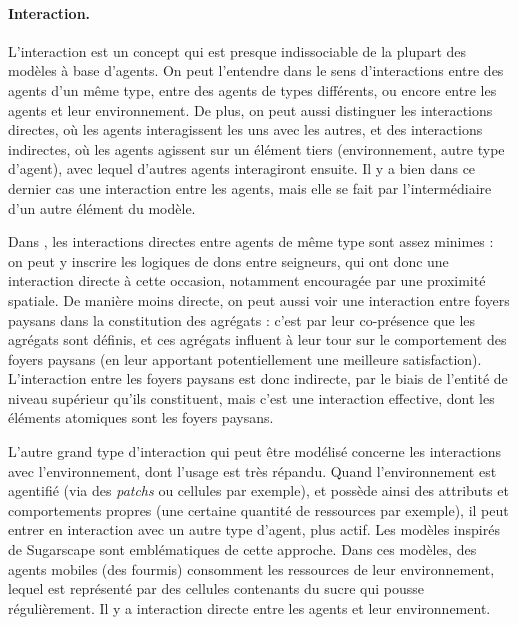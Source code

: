 \paragraph{Interaction.} L'interaction est un concept qui est presque indissociable de la plupart des modèles à base d'agents.
On peut l'entendre dans le sens d'interactions entre des agents d'un même type, entre des agents de types différents, ou encore entre les agents et leur environnement.
De plus, on peut aussi distinguer les interactions directes, où les agents interagissent les uns avec les autres, et des interactions indirectes, où les agents agissent sur un élément tiers (environnement, autre type d'agent), avec lequel d'autres agents interagiront ensuite.
Il y a bien dans ce dernier cas une interaction entre les agents, mais elle se fait par l'intermédiaire d'un autre élément du modèle.

Dans \simfeodal{}, les interactions directes entre agents de même type sont assez minimes : on peut y inscrire les logiques de dons entre seigneurs, qui ont donc une interaction directe à cette occasion, notamment encouragée par une proximité spatiale.
De manière moins directe, on peut aussi voir une interaction entre foyers paysans dans la constitution des agrégats : c'est par leur co-présence que les agrégats sont définis, et ces agrégats influent à leur tour sur le comportement des foyers paysans (en leur apportant potentiellement une meilleure satisfaction).
L'interaction entre les foyers paysans est donc indirecte, par le biais de l'entité de niveau supérieur qu'ils constituent, mais c'est une interaction effective, dont les éléments atomiques sont les foyers paysans.

L'autre grand type d'interaction qui peut être modélisé concerne les interactions avec l'environnement, dont l'usage est très répandu.
Quand l'environnement est agentifié (via des \textit{patchs} ou cellules par exemple), et possède ainsi des attributs et comportements propres (une certaine quantité de ressources par exemple), il peut entrer en interaction avec un autre type d'agent, plus \og actif\fg{}.
Les modèles inspirés de \mbox{\og Sugarscape\fg{}} \autocite{epstein_growing_1996} sont emblématiques de cette approche.
Dans ces modèles, des agents mobiles (des fourmis) \og consomment\fg{} les ressources de leur environnement, lequel est représenté par des cellules contenants du \og sucre\fg{} qui \og pousse\fg{} régulièrement.
Il y a interaction directe entre les agents et leur environnement.

